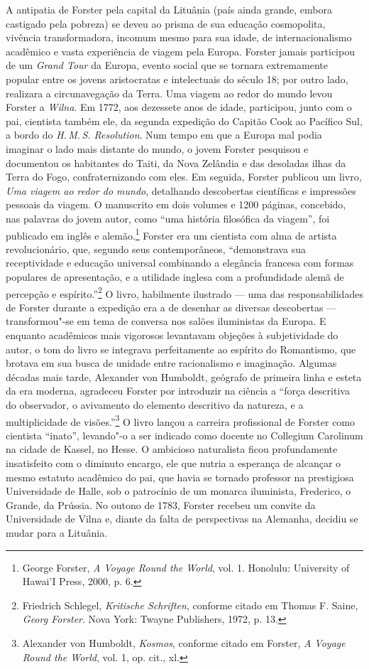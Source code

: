 A antipatia de Forster pela capital da Lituânia (país ainda grande,
embora castigado pela pobreza) se deveu ao prisma de sua educação
cosmopolita, vivência transformadora, incomum mesmo para sua idade, de
internacionalismo acadêmico e vasta experiência de viagem pela Europa.
Forster jamais participou de um \textit{Grand Tour} da Europa, evento
social que se tornara extremamente popular entre os jovens aristocratas
e intelectuais do século 18; por outro lado, realizara a circunavegação
da Terra. Uma viagem ao redor do mundo levou Forster a \textit{Wilna}. Em 1772,
aos dezessete anos de idade, participou, junto com o pai, cientista
também ele, da segunda expedição do Capitão Cook ao Pacífico Sul, a
bordo do \textit{H.\,M.\,S. Resolution}. Num tempo em que a Europa mal podia
imaginar o lado mais distante do mundo, o jovem Forster pesquisou e
documentou os habitantes do Taiti, da Nova Zelândia e das desoladas
ilhas da Terra do Fogo, confraternizando com eles. Em seguida, Forster
publicou um livro, \textit{Uma viagem ao redor do mundo}, detalhando
descobertas científicas e impressões pessoais da viagem. O manuscrito em
dois volumes e 1200 páginas, concebido, nas palavras do jovem autor,
como ``uma história filosófica da viagem'', foi publicado em inglês e
alemão.\footnote{George Forster, \textit{A Voyage Round the World}, vol. 1. Honolulu: University of Hawai'I Press, 2000, p. 6.}
Forster era um cientista com alma de artista revolucionário, que,
segundo seus contemporâneos, ``demonstrava sua receptividade e educação
universal combinando a elegância francesa com formas populares de
apresentação, e a utilidade inglesa com a profundidade alemã de
percepção e espírito.''\footnote{Friedrich Schlegel, \textit{Kritische Schriften}, conforme citado em Thomas F. Saine, \textit{Georg Forster}. Nova York: Twayne Publishers, 1972, p. 13.} O livro, habilmente ilustrado --- uma das responsabilidades de Forster durante a expedição era
a de desenhar as diversas descobertas --- transformou"-se em tema de
conversa nos salões iluministas da Europa. E enquanto acadêmicos mais
vigorosos levantavam objeções à subjetividade do autor, o tom do livro
se integrava perfeitamente ao espírito do Romantismo, que brotava em sua
busca de unidade entre racionalismo e imaginação. Algumas décadas mais
tarde, Alexander von Humboldt, geógrafo de primeira linha e esteta da
era moderna, agradeceu Forster por introduzir na ciência a ``força
descritiva do observador, o avivamento do elemento descritivo da
natureza, e a multiplicidade de visões.''\footnote{Alexander von Humboldt, \textit{Kosmos}, conforme citado em Forster, \textit{A Voyage Round the World}, vol. 1, op. cit., xl.}
O livro lançou a carreira profissional de Forster como cientista
``inato'', levando"-o a ser indicado como docente no Collegium Carolinum
na cidade de Kassel, no Hesse. O ambicioso naturalista ficou
profundamente insatisfeito com o diminuto encargo, ele que nutria a
esperança de alcançar o mesmo estatuto acadêmico do pai, que havia se
tornado professor na prestigiosa Universidade de Halle, sob o patrocínio
de um monarca iluminista, Frederico, o Grande, da Prússia. No outono de
1783, Forster recebeu um convite da Universidade de Vilna e, diante da
falta de perspectivas na Alemanha, decidiu se mudar para a Lituânia.

